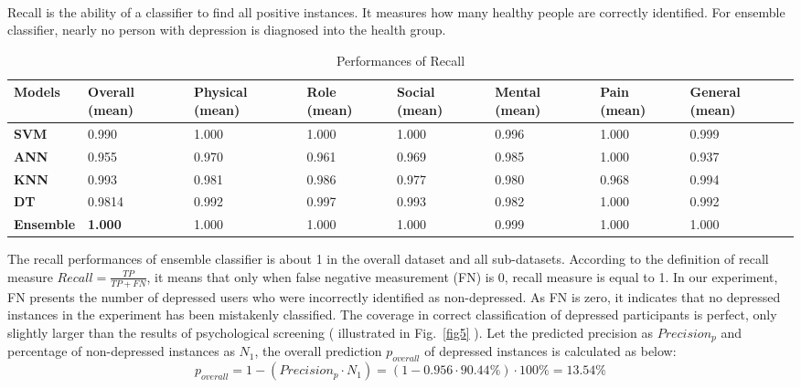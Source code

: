\documentclass[runningheads]{llncs}
\begin{document}
\paragraph{}
Recall is the ability of a classifier to find all positive instances. It measures how many healthy people are correctly identified. For ensemble classifier, nearly no person with depression is diagnosed into the health group.
\begin{table}[h]
\begin{tabular}{|C{2cm}|C{1.5cm}|C{1.5cm}|C{1.5cm}|C{1.5cm}|C{1.5cm}|C{1.5cm}|C{1.5cm}|}
\hline
{} 
{\color[HTML]{333333} \textbf{Models}} & {\color[HTML]{333333} \textbf{Overall (mean)}} & {\color[HTML]{333333} \textbf{Physical (mean)}} & {\color[HTML]{333333} \textbf{Role (mean)}} &{\color[HTML]{333333} \textbf{Social (mean)}} & {\color[HTML]{333333} \textbf{Mental (mean)}} & {\color[HTML]{333333} \textbf{Pain (mean)}} & {\color[HTML]{333333} \textbf{General (mean)}} \\ \hline
{} 
\textbf{SVM} & 0.990 & 1.000  & 1.000  & 1.000  & 0.996   & 1.000   & 0.999    \\ \hline
{} 
\textbf{ANN}   & 0.955 & 0.970  & 0.961  & 0.969  & 0.985  & 1.000  & 0.937     \\ \hline
{} 
\textbf{KNN}  & 0.993 & 0.981  & 0.986  & 0.977 & 0.980 & 0.968  & 0.994      \\ \hline
{} 
\textbf{DT}  & 0.9814 & 0.992  & 0.997  & 0.993 & 0.982  & 1.000  & 0.992    \\ \hline
{} 
\textbf{Ensemble}   & \textbf{1.000} & 1.000 & 1.000  & 1.000  & 0.999  & 1.000 & 1.000   \\ \hline
\end{tabular}
\caption{Performances of Recall}
\label{Recall}
\end{table}
%
%
%
The recall performances of ensemble classifier is about 1 in the overall dataset and all sub-datasets. According to the definition of recall measure  $ Recall = \frac{TP}{TP + FN} $, it means that only when false negative measurement (FN) is 0, recall measure is equal to 1. In our experiment, FN presents the number of depressed users who were incorrectly identified as non-depressed. As FN is zero, it indicates that no depressed instances in the experiment has been mistakenly classified. The coverage in correct classification of depressed participants is perfect, only slightly larger than the results of psychological screening ( illustrated in Fig.~\ref{fig5} ). Let the predicted precision as $Precision_{p}$ and percentage of non-depressed instances as $N_{1}$, the overall prediction $p_{overall}$ of depressed instances is calculated as below:\\
\begin{equation}\label{reio}
	p_{overall} = 1 - (Precision_{p} \cdot N_{1})= (1 -  0.956 \cdot 90.44\%) \cdot 100\% = 13.54\%
\end{equation}
\end{document}
